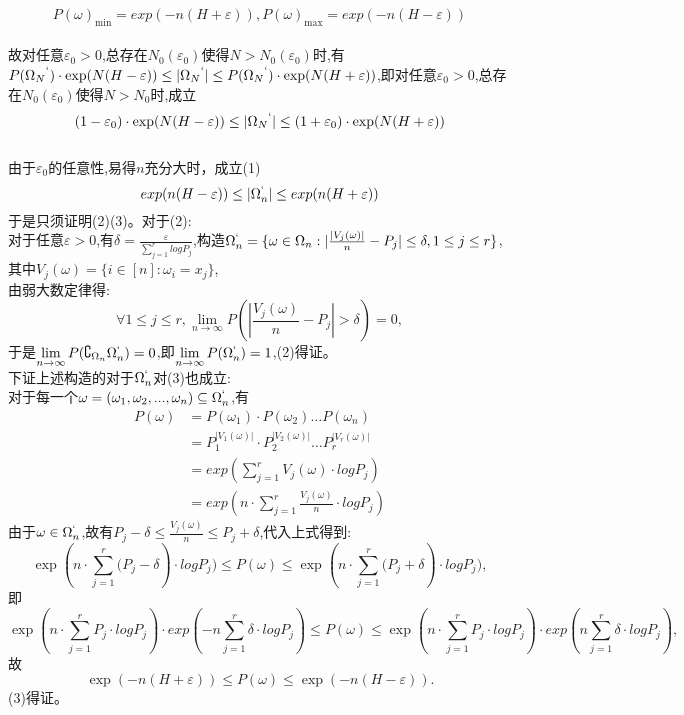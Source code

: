 \begin{thm} 
        $$P{(\omega )_{\min }}=exp(-n(H+\varepsilon)),P{(\omega )_{\max }}=exp(-n(H-\varepsilon))$$\\
        故对任意$\varepsilon_0>0$,总存在$N_0(\varepsilon_0)$使得$N>N_0(\varepsilon_0)$时,有
        $P({\Omega _N}^`) \cdot \exp (N(H - \varepsilon )) \le |{\Omega _N}^`| \le P({\Omega _N}^`) \cdot \exp (N(H + \varepsilon ))$,即对任意$\varepsilon_0>0$,总存在$N_0(\varepsilon_0)$使得$N>N_0$时,成立\\
        $$(1 - \varepsilon_0 ) \cdot \exp (N(H - \varepsilon )) \le |{\Omega _N}^`| \le (1 + \varepsilon_0 ) \cdot \exp (N(H + \varepsilon ))$$\\
        由于$\varepsilon_0$的任意性,易得$n$充分大时，成立(1)
        $$exp(n(H-\varepsilon)) \le |\Omega_n^`| \le exp(n(H+\varepsilon))$$
        于是只须证明(2)(3)。对于(2):\\
        对于任意$\varepsilon>0$,有$\delta=\frac{\varepsilon}{\sum\limits_{j = 1}^r logP_j}$,构造$\Omega_n^`=\{\omega \in \Omega_n:|\frac{|V_j(\omega)|}{n}-P_j| \le \delta,1\le j \le r\}$,其中$V_j(\omega)=\{i \in [n]:\omega_i=x_j\}$,\\
        由弱大数定律得:\[\forall 1 \leqslant j \leqslant r,\mathop {lim}\limits_{n \to \infty } P(|\frac{{{V_j}(\omega )}}{n} - {P_j}| > \delta ) = 0,\]
        于是$\mathop {\lim }\limits_{n \to \infty } P({\complement _{{\Omega _n}}}\Omega _n^`) = 0$,即$\mathop {\lim }\limits_{n \to \infty } P(\Omega _n^`) = 1$,(2)得证。\\
        下证上述构造的对于$\Omega _n^`$对(3)也成立:\\
        对于每一个$\omega = (\omega_1,\omega_2,...,\omega_n) \subseteq \Omega_n^`$,有
        \begin{align*}  
        P(\omega ) &= P({\omega _1}) \cdot P({\omega _2}) \ldots P({\omega _n}) \\  
        &= P_1^{|V_1(\omega)|}\cdot P_2^{|V_2(\omega)|} \ldots P_r^{|V_r(\omega)|}  \\  
        &= exp(\sum\limits_{j = 1}^r {V_j(\omega)\cdot logP_j}) \\
        &= exp(n\cdot \sum\limits_{j = 1}^r {\frac{V_j(\omega)}{n}\cdot logP_j}) 
        \end{align*}  
        由于$\omega \in \Omega_n^`$,故有${P_j} - \delta  \leqslant \frac{{{V_j}(\omega )}}{n} \leqslant {P_j} + \delta $,代入上式得到:
        \[\exp (n \cdot \sum\limits_{j = 1}^r {({P_j} - \delta } ) \cdot log{P_j}) \leqslant P(\omega ) \leqslant \exp (n \cdot \sum\limits_{j = 1}^r {({P_j} + \delta } ) \cdot log{P_j}),\]
        即\[\exp (n \cdot \sum\limits_{j = 1}^r {{P_j}}  \cdot log{P_j}) \cdot exp( - n\sum\limits_{j = 1}^r \delta   \cdot log{P_j}) \leqslant P(\omega ) \leqslant \exp (n \cdot \sum\limits_{j = 1}^r {{P_j}}  \cdot log{P_j}) \cdot exp(n\sum\limits_{j = 1}^r \delta   \cdot log{P_j}),\]
        故\[\exp ( - n(H + \varepsilon )) \leqslant P(\omega ) \leqslant \exp ( - n(H - \varepsilon )).\]
        (3)得证。
	\end{thm}
